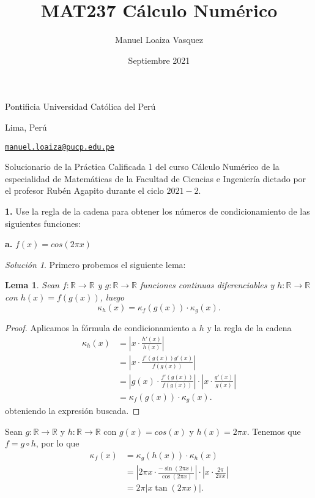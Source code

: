 \documentclass{article}
\title{MAT237 C\'alculo Num\'erico}
\author{Manuel Loaiza Vasquez}
\date{Septiembre 2021}
\newenvironment{statement}[1]{\smallskip\noindent\color[rgb]{1.00,0.00,0.50} {\bf #1.}}{}
\newtheorem{lemma}[theorem]{Lema}
\theoremstyle{definition}
\theoremstyle{remark}
\newtheorem*{solution}{Soluci\'on}
\newcommand{\BR}{\mathbb R}
\begin{document}
\maketitle

\vspace*{-0.25in}
\centerline{Pontificia Universidad Cat\'olica del Per\'u}
\centerline{Lima, Per\'u}
\centerline{\href{mailto:manuel.loaiza@pucp.edu.pe}{{\tt manuel.loaiza@pucp.edu.pe}}}
\vspace*{0.15in}

\begin{framed}
  Solucionario de la Pr\'actica Calificada 1 del curso C\'alculo Num\'erico
  de la especialidad de Matem\'aticas de la Facultad de Ciencias e Ingenier\'ia
  dictado por el profesor Rub\'en Agapito durante el ciclo $2021-2$.
\end{framed}

\begin{statement}{1}
  Use la regla de la cadena para obtener los n\'umeros de condicionamiento de
  las siguientes funciones:
\end{statement}

\begin{statement}{a}
  $f(x) = cos(2 \pi x)$
\end{statement}

\begin{solution}
  Primero probemos el siguiente lema:

  \begin{lemma}
    Sean $f:\BR \to \BR$ y $g:\BR \to \BR$ funciones continuas diferenciables y
    $h: \BR \to \BR$ con $h(x) = f(g(x))$, luego
    \[
      \kappa_h(x) = \kappa_f(g(x)) \cdot \kappa_g(x).
    \]
  \end{lemma}

  \begin{proof}
    Aplicamos la f\'ormula de condicionamiento a $h$ y la regla de la cadena
    \begin{align*}
      \kappa_h(x) &= \left|x \cdot \frac{h'(x)}{h(x)}\right|\\
      &= \left|x \cdot \frac{f'(g(x)) g'(x)}{f(g(x))}\right|\\
      &= \left|g(x) \cdot \frac{f'(g(x))}{f(g(x))}\right| \cdot \left|x \cdot \frac{g'(x)}{g(x)}\right|\\
      &= \kappa_f(g(x)) \cdot \kappa_g(x).
    \end{align*}
    obteniendo la expresi\'on buscada.
  \end{proof}

  Sean $g: \BR \to \BR$ y $h: \BR \to \BR$ con $g(x) = cos(x)$ y $h(x) = 2 \pi x$.
  Tenemos que $f = g \circ h$, por lo que
  \begin{align*}
    \kappa_f(x) &= \kappa_g(h(x)) \cdot \kappa_h(x)\\
    &= \left|2 \pi x \cdot \frac{-\sin(2 \pi x)}{\cos(2 \pi x)}\right| \cdot \left|x \cdot \frac{2 \pi}{2 \pi x}\right|\\
    &= 2\pi|x \tan(2 \pi x)|.
  \end{align*}
\end{solution}
\end{document}
